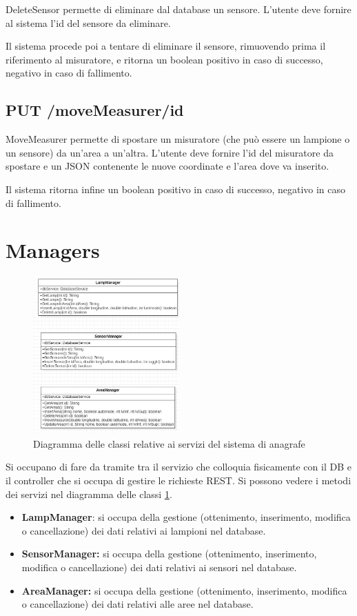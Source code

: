 DeleteSensor permette di eliminare dal database un sensore. L'utente deve fornire al sistema l'id del sensore da eliminare.

Il sistema procede poi a tentare di eliminare il sensore, rimuovendo prima il riferimento al misuratore, e ritorna un boolean positivo in caso di successo, negativo in caso di fallimento.

\subsection { PUT /moveMeasurer/id}

MoveMeasurer permette di spostare un misuratore (che può essere un lampione o un sensore) da un'area a un'altra. L'utente deve fornire l'id del misuratore da spostare e un JSON contenente le nuove coordinate e l'area dove va inserito.

Il sistema ritorna infine un boolean positivo in caso di successo, negativo in caso di fallimento.

\section{Managers}

\begin{figure}[h]
    \centering
    \includegraphics[width=0.5\textwidth]{img/services_anagrafe.png}
    \caption{Diagramma delle classi relative ai servizi del sistema di anagrafe}
    \label{fig:services_anagrafe}
\end{figure}

Si occupano di fare da tramite tra il servizio che colloquia fisicamente con il DB e il controller che si occupa di gestire le richieste REST.
Si possono vedere i metodi dei servizi nel diagramma delle classi \ref{fig:services_anagrafe}.

\begin{itemize}
    \item \textbf{LampManager}: si occupa della gestione (ottenimento, inserimento, modifica o cancellazione) dei dati relativi ai lampioni nel database.
    \item \textbf{SensorManager:} si occupa della gestione (ottenimento, inserimento, modifica o cancellazione) dei dati relativi ai sensori nel database. 
    \item \textbf{AreaManager:} si occupa della gestione (ottenimento, inserimento, modifica o cancellazione) dei dati relativi alle aree nel database.
\end{itemize}

